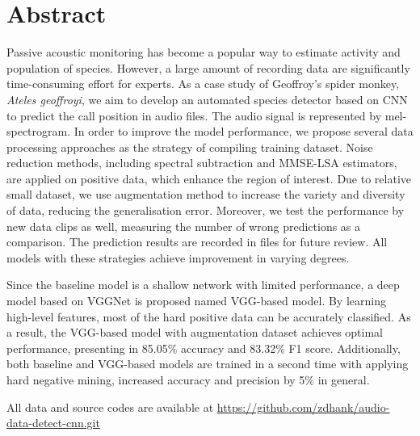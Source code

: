 
\renewcommand{\baselinestretch}{1.5}
\chapter{Abstract}
\renewcommand{\baselinestretch}{\mystretch}
Passive acoustic monitoring has become a popular way to estimate activity and population of species. However, a large amount of recording data are significantly time-consuming effort for experts. As a case study of Geoffroy's spider monkey, \textit {Ateles geoffroyi}, we aim to develop an automated species detector based on CNN to predict the call position in audio files. The audio signal is represented by mel-spectrogram. In order to improve the model performance, we propose several data processing approaches as the strategy of compiling training dataset. Noise reduction methods, including spectral subtraction and MMSE-LSA estimators, are applied on positive data, which enhance the region of interest. Due to relative small dataset,  we use augmentation method to increase the variety and diversity of data, reducing the generalisation error. Moreover, we test the performance by new data clips as well, measuring the number of wrong predictions as a comparison. The prediction results are recorded in files for future review. All models with these strategies achieve improvement in varying degrees.\par
Since the baseline model is a shallow network with limited performance, a deep model based on VGGNet is proposed named VGG-based model. By learning high-level features, most of the hard positive data can be accurately classified. As a result, the VGG-based model with augmentation dataset achieves optimal performance, presenting in 85.05\% accuracy and 83.32\% F1 score. Additionally, both baseline and VGG-based models are trained in a second time with applying hard negative mining, increased accuracy and precision by 5\% in general.\par
All data and source codes are available at \url{https://github.com/zdhank/audio-data-detect-cnn.git}




